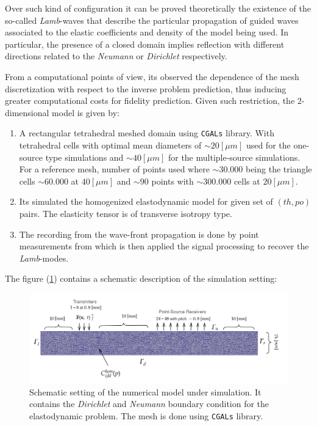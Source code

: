Over such kind of configuration it can be proved theoretically the existence of the so-called \textit{Lamb}-waves that describe the particular propagation of guided waves associated to the elastic coefficients and density of the model being used.
In particular, the presence of a closed domain implies reflection with different directions related to the \textit{Neumann} or \textit{Dirichlet} respectively.


From a computational points of view, its observed the dependence of the mesh discretization with respect to the inverse problem prediction, thus inducing greater computational costs for fidelity prediction. Given such restriction, the 2-dimensional model is given by:
\begin{enumerate}
    \item A rectangular tetrahedral meshed domain using \texttt{CGALs} library. With tetrahedral cells with optimal mean diameters of $\sim 20 [\mu m]$ used for the one-source type simulations and $\sim 40 [\mu m]$ for the multiple-source simulations. For a reference mesh, number of points used where $\sim 30.000$ being the triangle cells $\sim 60.000$ at $40 [\mu m]$ and $\sim 90$ points with $\sim 300.000$ cells at $20 [\mu m]$.
    \item Its simulated the homogenized elastodynamic model for given set of $(th, po)$ pairs. The elasticity tensor is of transverse isotropy type.
    \item The recording from the wave-front propagation is done by point measurements from which is then applied the signal processing to recover the \textit{Lamb}-modes.
\end{enumerate}

The figure (\ref{MeshFile2D}) contains a schematic description of the simulation setting:
\begin{figure}[!h]
	\centering
	\includegraphics[width=\textwidth]{images/ImgExt/SimP5TransIso12M780-MeshFile.png}
	\caption{Schematic setting of the numerical model under simulation. It contains the \textit{Dirichlet} and \textit{Neumann} boundary condition for the elastodynamic problem. The mesh is done using \texttt{CGALs} library.}
	\label{MeshFile2D}
\end{figure}

